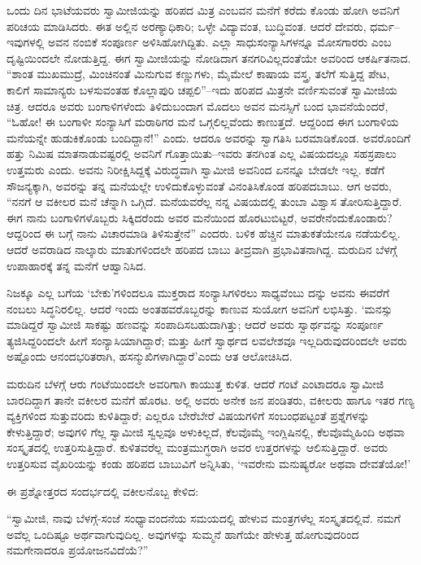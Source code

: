 ಒಂದು ದಿನ ಭಾಟೆಯವರು ಸ್ವಾಮೀಜಿಯನ್ನು ಹರಿಪದ ಮಿತ್ರ ಎಂಬವನ ಮನೆಗೆ ಕರೆದು ಕೊಂಡು ಹೋಗಿ ಅವನಿಗೆ ಪರಿಚಯ ಮಾಡಿಸಿದರು. ಈತ ಅಲ್ಲಿನ ಅರಣ್ಯಾಧಿಕಾರಿ; ಒಳ್ಳೇ ವಿದ್ಯಾವಂತ, ಬುದ್ಧಿವಂತ. ಆದರೆ ದೇವರು, ಧರ್ಮ–ಇವುಗಳಲ್ಲಿ ಅವನ ನಂಬಿಕೆ ಸಂಪೂರ್ಣ ಅಳಿಸಿಹೋಗಿದ್ದಿತು. ಎಲ್ಲಾ ಸಾಧುಸಂನ್ಯಾಸಿಗಳನ್ನೂ ಮೋಸಗಾರರು ಎಂಬ ದೃಷ್ಟಿಯಿಂದಲೇ ನೋಡುತ್ತಿದ್ದ. ಈಗ ಸ್ವಾಮೀಜಿಯನ್ನು ನೋಡಿದಾಗ ತನಗರಿವಿಲ್ಲದಂತೆಯೇ ಅವರಿಂದ ಆಕರ್ಷಿತನಾದ. “ಶಾಂತ ಮುಖಮುದ್ರೆ, ಮಿಂಚಿನಂತೆ ಮಿನುಗುವ ಕಣ್ಣುಗಳು, ಮೈಮೇಲೆ ಕಾಷಾಯ ವಸ್ತ್ರ, ತಲೆಗೆ ಸುತ್ತಿದ್ದ ಪೇಟ, ಕಾಲಿಗೆ ಸಾಮಾನ್ಯರು ಬಳಸುವಂತಹ ಕೊಲ್ಲಾಪುರಿ ಚಪ್ಪಲಿ”–ಇದು ಹರಿಪದ ಮಿತ್ರನೇ ವರ್ಣಿಸುವಂತೆ ಸ್ವಾಮೀಜಿಯ ಚಿತ್ರ. ಆದರೂ ಅವರು ಬಂಗಾಳಿಗಳೆಂದು ತಿಳಿದುಬಂದಾಗ ಮೊದಲು ಅವನ ಮನಸ್ಸಿಗೆ ಬಂದ ಭಾವನೆಯೆಂದರೆ, “ಓಹೋ! ಈ ಬಂಗಾಳೀ ಸಂನ್ಯಾಸಿಗೆ ಮರಾಠಿಗರ ಮನೆ ಒಗ್ಗಲಿಲ್ಲವೆಂದು ಕಾಣುತ್ತದೆ. ಆದ್ದರಿಂದ ಈಗ ಬಂಗಾಳಿಯ ಮನೆಯನ್ನೇ ಹುಡುಕಿಕೊಂಡು ಬಂದಿದ್ದಾನೆ!” ಎಂದು. ಆದರೂ ಅವರನ್ನು ಸ್ವಾಗತಿಸಿ ಬರಮಾಡಿಕೊಂಡ. ಅವರೊಂದಿಗೆ ಹತ್ತು ನಿಮಿಷ ಮಾತನಾಡುವಷ್ಟರಲ್ಲಿ ಅವನಿಗೆ ಗೊತ್ತಾಯಿತು–ಇವರು ತನಗಿಂತ ಎಲ್ಲ ವಿಷಯದಲ್ಲೂ ಸಹಸ್ರಪಾಲು ಉತ್ತಮರು ಎಂದು. ಅವನು ನಿರೀಕ್ಷಿಸಿದ್ದಕ್ಕೆ ವಿರುದ್ಧವಾಗಿ ಸ್ವಾಮೀಜಿ ಅವನಿಂದ ಏನನ್ನೂ ಬೇಡಲೇ ಇಲ್ಲ. ಕಡೆಗೆ ಸೌಜನ್ಯಕ್ಕಾಗಿ, ಅವರನ್ನು ತನ್ನ ಮನೆಯಲ್ಲೇ ಉಳಿದುಕೊಳ್ಳುವಂತೆ ವಿನಂತಿಸಿಕೊಂಡ ಹರಿಪದಬಾಬು. ಆಗ ಅವರು, “ನನಗೆ ಆ ವಕೀಲರ ಮನೆ ಚೆನ್ನಾಗಿ ಒಗ್ಗಿದೆ. ಮನೆಯವರೆಲ್ಲ ನನ್ನ ವಿಷಯದಲ್ಲಿ ತುಂಬಾ ವಿಶ್ವಾಸ ತೋರಿಸುತ್ತಿದ್ದಾರೆ. ಈಗ ನಾನು ಬಂಗಾಳಿಗಳೊಬ್ಬರು ಸಿಕ್ಕಿದರೆಂದು ಅವರ ಮನೆಯಿಂದ ಹೊರಟುಬಿಟ್ಟರೆ, ಅವರೇನೆಂದುಕೊಂಡಾರು? ಆದ್ದರಿಂದ ಈ ಬಗ್ಗೆ ನಾನು ವಿಚಾರಮಾಡಿ ತಿಳಿಸುತ್ತೇನೆ” ಎಂದರು. ಬಳಿಕ ಹೆಚ್ಚಿನ ಮಾತುಕತೆಯೇನೂ ನಡೆಯಲಿಲ್ಲ. ಆದರೆ ಅವರಾಡಿದ ನಾಲ್ಕಾರು ಮಾತುಗಳಿಂದಲೇ ಹರಿಪದ ಬಾಬು ತೀವ್ರವಾಗಿ ಪ್ರಭಾವಿತನಾಗಿದ್ದ. ಮರುದಿನ ಬೆಳಗ್ಗೆ ಉಪಾಹಾರಕ್ಕೆ ತನ್ನ ಮನೆಗೆ ಆಹ್ವಾನಿಸಿದ.

ನಿಜಕ್ಕೂ ಎಲ್ಲ ಬಗೆಯ ‘ಬೇಕು’ಗಳಿಂದಲೂ ಮುಕ್ತರಾದ ಸಂನ್ಯಾಸಿಗಳಿರಲು ಸಾಧ್ಯವೆಂಬು ದನ್ನು ಅವನು ಈವರೆಗೆ ನಂಬಲು ಸಿದ್ಧನಿರಲಿಲ್ಲ. ಆದರೆ ಇಂದು ಅಂತಹವರೊಬ್ಬರನ್ನು ಕಾಣುವ ಸುಯೋಗ ಅವನಿಗೆ ಲಭಿಸಿತ್ತು. ‘ಮನಸ್ಸು ಮಾಡಿದ್ದರೆ ಸ್ವಾಮೀಜಿ ಸಾಕಷ್ಟು ಹಣವನ್ನು ಸಂಪಾದಿಸಬಹುದಾಗಿತ್ತು; ಆದರೆ ಅವರು ಸ್ವಾರ್ಥವನ್ನು ಸಂಪೂರ್ಣ ತ್ಯಜಿಸಿದ್ದರಿಂದಲೇ ಹೀಗೆ ಸಂನ್ಯಾಸಿಯಾಗಿದ್ದಾರೆ; ಮತ್ತು ಹೀಗೆ ಸ್ವಾರ್ಥದ ಲವಲೇಶವೂ ಇಲ್ಲದಿರುವುದರಿಂದಲೇ ಅವರು ಅಷ್ಟೊಂದು ಆನಂದಭರಿತರಾಗಿ, ಹಸನ್ಮುಖಿಗಳಾಗಿದ್ದಾರೆ’ಎಂದು ಆತ ಆಲೋಚಿಸಿದ.

ಮರುದಿನ ಬೆಳಗ್ಗೆ ಆರು ಗಂಟೆಯಿಂದಲೇ ಅವರಿಗಾಗಿ ಕಾಯುತ್ತ ಕುಳಿತ. ಆದರೆ ಗಂಟೆ ಎಂಟಾದರೂ ಸ್ವಾಮೀಜಿ ಬಾರದಿದ್ದಾಗ ತಾನೇ ವಕೀಲರ ಮನೆಗೆ ಹೊರಟ. ಅಲ್ಲಿ ಅವರು ಅನೇಕ ಜನ ಪಂಡಿತರು, ವಕೀಲರು ಹಾಗೂ ಇತರ ಗಣ್ಯ ವ್ಯಕ್ತಿಗಳಿಂದ ಸುತ್ತುವರಿದು ಕುಳಿತಿದ್ದಾರೆ; ಎಲ್ಲರೂ ಬೇರೆಬೇರೆ ವಿಷಯಗಳಿಗೆ ಸಂಬಂಧಪಟ್ಟಂತೆ ಪ್ರಶ್ನೆಗಳನ್ನು ಕೇಳುತ್ತಿದ್ದಾರೆ; ಅವುಗಳಿ ಗೆಲ್ಲ ಸ್ವಾಮೀಜಿ ಸ್ವಲ್ಪವೂ ಅಳುಕಿಲ್ಲದೆ, ಕೆಲವೊಮ್ಮೆ ಇಂಗ್ಲಿಷಿನಲ್ಲಿ, ಕೆಲವೊಮ್ಮೆಹಿಂದಿ ಅಥವಾ ಸಂಸ್ಕೃತದಲ್ಲಿ ಉತ್ತರಿಸುತ್ತಿದ್ದಾರೆ. ಕುಳಿತವರೆಲ್ಲ ಮಂತ್ರಮುಗ್ಧರಾಗಿ ಅವರ ಉತ್ತರಗಳನ್ನು ಆಲಿಸುತ್ತಿದ್ದಾರೆ. ಅವರು ಉತ್ತರಿಸುವ ವೈಖರಿಯನ್ನು ಕಂಡು ಹರಿಪದ ಬಾಬುವಿಗೆ ಅನ್ನಿಸಿತು, ‘ಇವರೇನು ಮನುಷ್ಯರೋ ಅಥವಾ ದೇವತೆಯೋ!’

ಈ ಪ್ರಶ್ನೋತ್ತರದ ಸಂದರ್ಭದಲ್ಲಿ ವಕೀಲನೊಬ್ಬ ಕೇಳಿದ:

“ಸ್ವಾಮೀಜಿ, ನಾವು ಬೆಳಗ್ಗೆ-ಸಂಜೆ ಸಂಧ್ಯಾವಂದನೆಯ ಸಮಯದಲ್ಲಿ ಹೇಳುವ ಮಂತ್ರಗಳೆಲ್ಲ ಸಂಸ್ಕೃತದಲ್ಲಿವೆ. ನಮಗೆ ಅವೆಲ್ಲ ಒಂದಿಷ್ಟೂ ಅರ್ಥವಾಗುವುದಿಲ್ಲ. ಅವುಗಳನ್ನು ಸುಮ್ಮನೆ ಹಾಗೆಯೇ ಹೇಳುತ್ತ ಹೋಗುವುದರಿಂದ ನಮಗೇನಾದರೂ ಪ್ರಯೋಜನವಿದೆಯೆ?”

